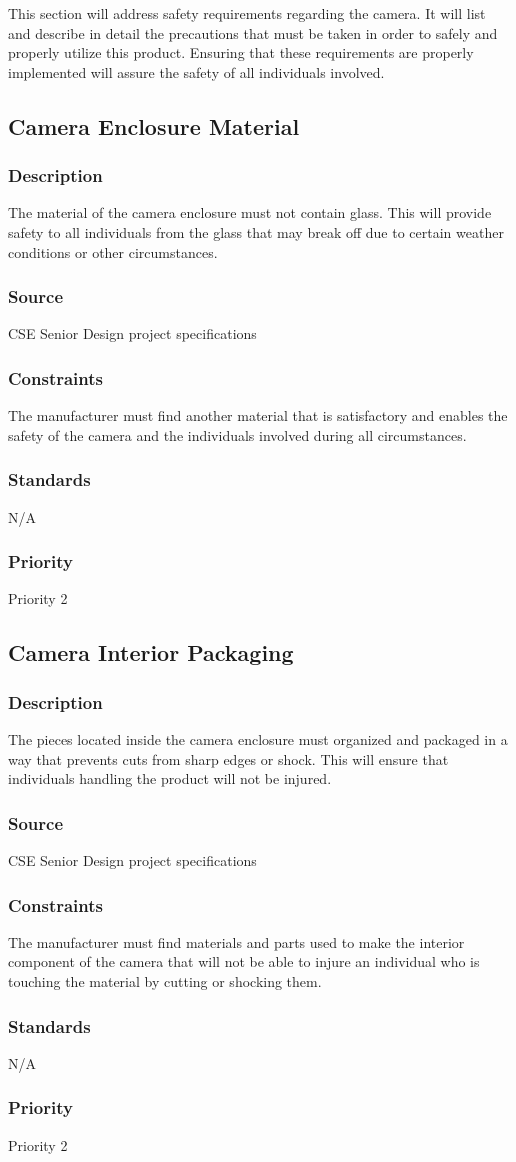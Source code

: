 This section will address safety requirements regarding the camera. It will list and describe in detail the precautions that must be taken in order to safely and properly utilize this product. Ensuring that these requirements are properly implemented will assure the safety of all individuals involved. 


\subsection{Camera Enclosure Material}
\subsubsection{Description}
The material of the camera enclosure must not contain glass. This will provide safety to all individuals from the glass that may break off due to certain weather conditions or other circumstances.
\subsubsection{Source}
CSE Senior Design project specifications
\subsubsection{Constraints}
The manufacturer must find another material that is satisfactory and enables the safety of the camera and the individuals involved during all circumstances. 
\subsubsection{Standards}
N/A
\subsubsection{Priority}
Priority 2

\subsection{Camera Interior Packaging }
\subsubsection{Description}
The pieces located inside the camera enclosure must organized and packaged in a way that prevents cuts from sharp edges or shock. This will ensure that individuals handling the product will not be injured. 
\subsubsection{Source}
CSE Senior Design project specifications
\subsubsection{Constraints}
The manufacturer must find materials and parts used to make the interior component of the camera that will not be able to injure an individual who is touching the material by cutting or shocking them.
\subsubsection{Standards}
N/A
\subsubsection{Priority}
Priority 2
